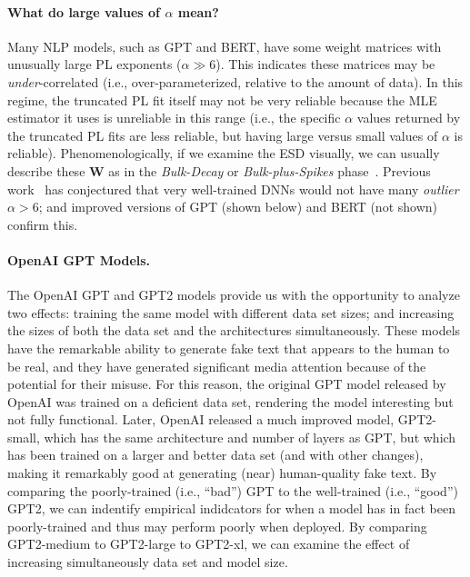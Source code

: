 \paragraph{What do large values of $\alpha$ mean?}

Many NLP models, such as GPT and BERT, have some weight matrices with unusually large PL exponents ($\alpha\gg 6$).
This indicates these matrices may be \emph{under}-correlated (i.e., over-parameterized, relative to the amount of data).
In this regime, the truncated PL fit itself may not be very reliable because the MLE estimator it uses is unreliable in this range (i.e., the specific $\alpha$ values returned by the truncated PL fits are less reliable, but having large versus small values of $\alpha$ is reliable).
Phenomenologically, if we examine the ESD visually, we can usually describe these $\mathbf{W}$ as in the \emph{Bulk-Decay} or \emph{Bulk-plus-Spikes} phase~\cite{MM18_TR,MM19_HTSR_ICML}.
Previous work~\cite{MM18_TR,MM19_HTSR_ICML} has conjectured that very well-trained DNNs would not have many \emph{outlier} $\alpha>6$; and improved versions of GPT (shown below) and BERT (not shown) confirm this.


\paragraph{OpenAI GPT Models.}

The OpenAI GPT and GPT2 models provide us with the opportunity to analyze two effects: training the same model with different data set sizes; and increasing the sizes of both the data set and the architectures simultaneously.
These models have the remarkable ability to generate fake text that appears to the human to be real, and they have generated significant media attention because of the potential for their misuse.
For this reason, the original GPT model released by OpenAI was trained on a deficient data set, rendering the model interesting but not fully functional.  
Later, OpenAI released a much improved model, GPT2-small, which has the same architecture and number of layers as GPT, but which has been trained on a larger and better data set (and with other changes), making it remarkably good at generating (near) human-quality fake text.  
%
By comparing the poorly-trained (i.e., ``bad'') GPT to the well-trained (i.e., ``good'') GPT2, we can indentify empirical indidcators for when a model has in fact been poorly-trained and thus may perform poorly when deployed.
By comparing GPT2-medium to GPT2-large to GPT2-xl, we can examine the effect of increasing simultaneously data set and model size.

